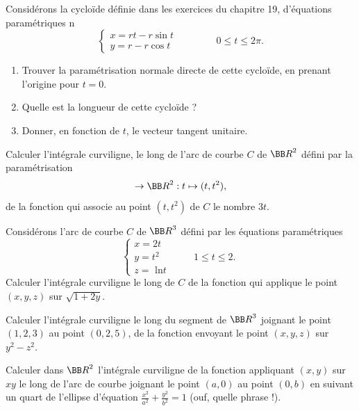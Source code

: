 \documentclass[12pt,french,oneside,a4paper]{memoir} %
\begin{document}
\begin{exo}
Considérons la cycloïde définie dans les exercices du chapitre 19,
d'équations paramétriques
n\begin{equation*}
\left\{
\begin{array}{l}
x=rt-r \sin t \\
y=r-r \cos t 
\end{array}
\right.
\qquad \qquad  0 \leq t \leq 2 \pi.
\end{equation*}
\begin{enumerate}
\item Trouver la paramétrisation normale directe de cette cycloïde, en
prenant l'origine pour $t=0$. 
\item Quelle est la longueur de cette cycloïde ? 
\item Donner, en fonction de $t$, le vecteur tangent unitaire.
\end{enumerate}
\end{exo}
\begin{exo}
Calculer l'intégrale curviligne, le long de l'arc de courbe $C$ de ${\BB R}^2$ 
défini par la paramétrisation
\begin{equation*}
[0,1] \rightarrow {\BB R}^2 : t \mapsto (t,t^2),
\end{equation*}
de la fonction qui associe au point $(t,t^2)$ de $C$ le nombre $3t$.
\end{exo}
\begin{exo}
Considérons l'arc de courbe $C$ de ${\BB R}^3$ défini par les équations 
paramétriques
\begin{equation*}
\left\{
\begin{array}{ll}
x=2t &\\
y=t^2 &\qquad 1 \leq t \leq 2. \\
z= \mbox{ ln} t&
\end{array}
\right.
\end{equation*}
Calculer l'intégrale curviligne le long de $C$ de la fonction qui applique le 
point $(x,y,z)$ sur $\sqrt{1+2y}$.
\end{exo}
\begin{exo}
Calculer l'intégrale curviligne le long du segment de ${\BB R}^3$ joignant le 
point $(1,2,3)$ au point $(0,2,5)$, de la fonction envoyant le point $(x,y,z)$ sur 
$y^2-z^2$.
\end{exo}
\begin{exo}
Calculer dans ${\BB R}^2$ l'intégrale curviligne de la fonction appliquant 
$(x,y)$ sur $xy$ le long de l'arc de courbe joignant le point $(a,0)$ au point $(0,b)$ 
en suivant un quart de l'ellipse d'équation $\displaystyle{\frac{x^2}{a^2}+ \frac{y^2}{b^2}=1}$ 
(ouf, quelle phrase !).
\end{exo}
\end{document}
